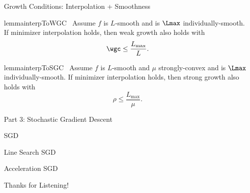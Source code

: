 \documentclass[mathserif,notheorems, hyperref={colorlinks, urlcolor=blue, linkcolor=blue}]{beamer}
\begin{document}
    \begin{frame}{Growth Conditions: Interpolation + Smoothness}
        
        \begin{restatable}{lemma}{interpToWGC}~\label{lemma:interpolation-to-wgc}
            Assume \( f \) is \( L \)-smooth and \oracle{} is \( \Lmax \) individually-smooth. 
            If minimizer interpolation holds, then weak growth also holds with
            \[ \wgc \leq \frac{L_{\text{max}}}{L}. \]
        \end{restatable}
       

        \begin{restatable}{lemma}{interpToSGC}~\label{lemma:interpolation-to-sgc}
            Assume \( f \) is \( L \)-smooth and \( \mu \) strongly-convex and \oracle{} is \( \Lmax \) individually-smooth. 
            If minimizer interpolation holds, then strong growth also holds with 
            \[ \rho \leq \frac{L_{\text{max}}}{\mu}. \]
        \end{restatable}

    \end{frame}


    
    \begin{frame}
       \begin{center}
          \huge Part 3: Stochastic Gradient Descent 
       \end{center} 
    \end{frame}
    

    \begin{frame}{SGD}
       
    \end{frame}

    \begin{frame}{Line Search}
       SGD 
    \end{frame}

    \begin{frame}{Acceleration}
       SGD 
    \end{frame}


    \begin{frame}{}
        \begin{center}
        \huge Thanks for Listening!
        \end{center}
    \end{frame}
\end{document}

